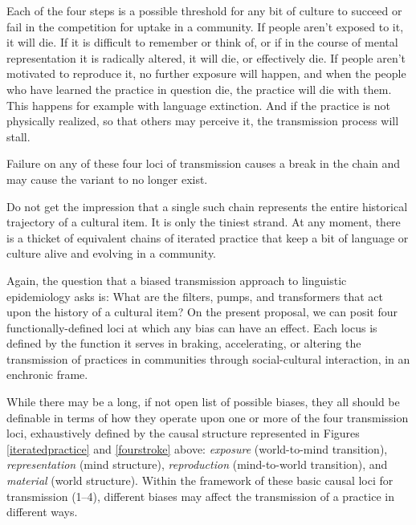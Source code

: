 Each of the four steps is a possible threshold for any bit 
of culture to succeed or fail in the competition for uptake in a community. If people aren't exposed to it, it will die. If it is 
difficult to remember or think of, or if in the course of mental 
representation it is radically altered, it will die, or effectively die. 
If people aren't motivated to reproduce it, no further exposure will 
happen, and when the people who have learned the practice in question die, the practice will die with them. This happens for example with language 
extinction. And if the practice is not physically realized, so that others may perceive it, the transmission process will 
stall. 



Failure on any of these four loci of transmission causes a break in the 
chain and may cause the variant to no longer exist. 



Do not get the impression that a single such chain 
represents the entire historical trajectory of a cultural item. It is 
only the tiniest strand. At any moment, there is a thicket of equivalent 
chains of iterated practice that keep a bit of language or culture alive and evolving in 
a community. 



Again, the question that a biased transmission approach 
to linguistic epidemiology asks is: What are the filters, 
pumps, and transformers that act upon the history of a cultural item? On the present proposal, we 
can posit four functionally-defined loci at which any bias can have an 
effect. Each locus is defined by the function it serves in braking, accelerating, or altering the transmission of practices in communities 
through social-cultural interaction, in an enchronic frame. 



While there may be a long, if not open list of possible biases, they all 
should be definable in terms of how they operate upon one or more of the four 
transmission loci, exhaustively defined by the causal structure 
represented in Figures \ref{iteratedpractice} and \ref{fourstroke} above: \textit{exposure} (world-to-mind transition), 
\textit{representation} (mind structure), \textit{reproduction} (mind-to-world 
transition), and \textit{material} (world structure). Within the framework of 
these basic causal loci for transmission (1--4), different biases may affect the transmission of a practice in different ways. 



